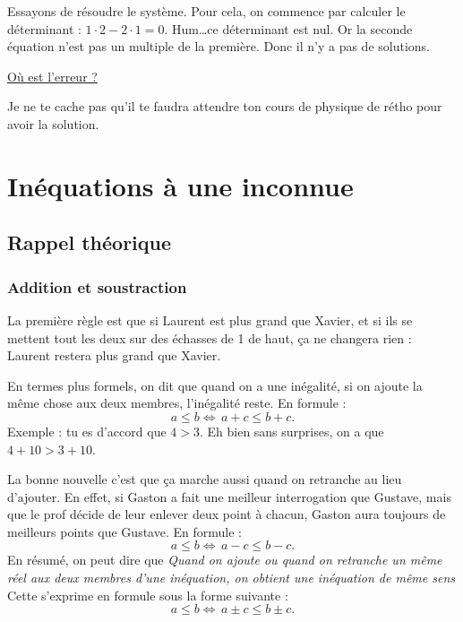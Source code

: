 \documentclass[a4paper,12pt]{book}
\theoremstyle{mes_exemples}	\newtheorem{exemple}[numtho]{Exemple}
\theoremstyle{mes_tho}
\begin{document}
Essayons de résoudre le système. Pour cela, on commence par calculer le déterminant : $1\cdot2-2\cdot 1=0$. Hum\ldots ce déterminant est nul. Or la seconde équation n'est pas un multiple de la première. Donc il n'y a pas de solutions.

 \href{http://fr.wikipedia.org/wiki/Liaison_nucléaire}{Où est l'erreur ?}

Je ne te cache pas qu'il te faudra attendre ton cours de physique de rétho pour avoir la solution.


%
   \section{Inéquations à une inconnue}
%

\subsection{Rappel théorique}

\subsubsection{Addition et soustraction}


La première règle est que si Laurent est plus grand que Xavier, et si ils se mettent tout les deux sur des échasses de \unit{1}{\meter} de haut, ça ne changera rien : Laurent restera plus grand que Xavier. 

En termes plus formels, on dit que quand on a une inégalité, si on ajoute la même chose aux deux membres, l'inégalité reste. En formule :
\[ 
  a\leq b\Longleftrightarrow\, a+c\leq b+ c.
\]
Exemple : tu es d'accord que $4 > 3$. Eh bien sans surprises, on a que $4+10 > 3+10$.

La bonne nouvelle c'est que ça marche aussi quand on retranche au lieu d'ajouter. En effet, si Gaston a fait une meilleur interrogation que Gustave, mais que le prof décide de leur enlever deux point à chacun, Gaston aura toujours de meilleurs points que Gustave. En formule :
\[ 
  a\leq b\Longleftrightarrow\, a-c\leq b- c.
\]
En résumé, on peut dire que
\emph{Quand on ajoute ou quand on retranche un même réel aux deux membres d'une inéquation, on obtient une inéquation de même sens}
Cette s'exprime en formule sous la forme suivante :
\[ 
  a\leq b\Longleftrightarrow\, a\pm c\leq b\pm c.
\]
\end{document}
